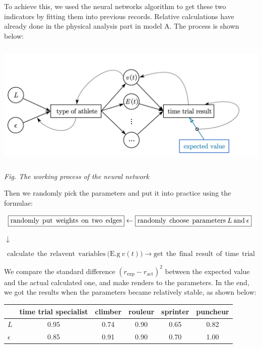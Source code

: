 \documentclass[12pt]{article}
\theoremstyle{definition}
\theoremstyle{remark}
\numberwithin{equation}{section}
\begin{document}
	To achieve this, we used the neural networks algorithm to get these two indicators by fitting them into previous records. Relative calculations have already done in the physical analysis part in model A. The process is shown below:

	\begin{center}
		\includegraphics[height = 6cm]{10.png}

		\small\textit{Fig. The working process of the neural network}
	\end{center}

	Then we randomly pick the parameters and put it into practice using the formulae:

	\[
		\boxed{\mathrm{randomly\:\:put\:\:weights\:\:on\:\:two\:\:edges}} \\
		\leftarrow
		\boxed{\mathrm{randomly\:\:choose\:\:parameters\:}L\mathrm{\:and\:}\epsilon} \
		\]

	\(
		\downarrow
		\)

	\[
		\boxed{\mathrm{calculate\:\:the\:\:relavent\:\:variables\:(E.g\:}v(t))} \rightarrow
		\boxed{{\mathrm{get\:\:the\:\:final\:\:result\:\:of\:\:time\:\:trial}}}
		\]

	We compare the standard difference \(\left( r_{\exp}-r_{\mathrm{act}} \right) ^2\) between the expected value and the actual calculated one, and make renders to the parameters. In the end, we got the results when the parameters became relatively stable, as shown below:

			\begin{center}
				\begin{tabular}{|l||c|c|c|c|c|}
					\hline
					&\textbf{time trial specialist} & \textbf{climber} & \textbf{rouleur} & \textbf{sprinter} & \textbf{puncheur} \\
					\hline
					\hline
					\(L\) & 0.95 & 0.74 & 0.90 & 0.65 & 0.82 \\
					\hline
					\(\epsilon\) & 0.85 & 0.91 & 0.90 & 0.70 & 1.00 \\
					\hline
				\end{tabular}
			\end{center}
\end{document}
